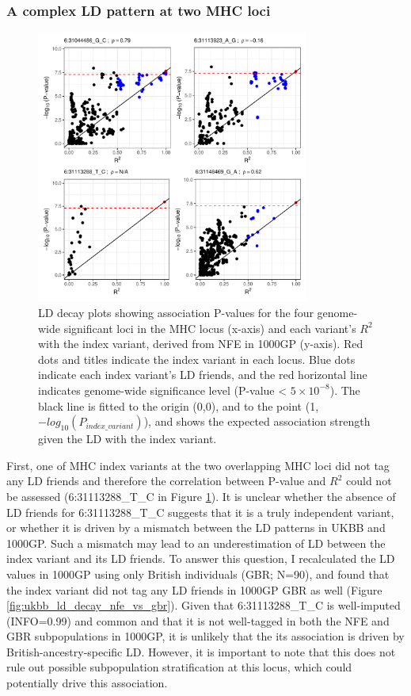   \subsubsection{A complex LD pattern at two MHC loci}
  \begin{figure}[H] 
    \centering    
    \includegraphics[width=0.8\textwidth]{ukbb_ld_decay_mhc}
    \caption[LD decay plots for the pAD-associated MHC loci in the UKBB analysis]{LD decay plots showing association P-values for the four genome-wide significant loci in the MHC locus (x-axis) and each variant's $R^{2}$ with the index variant, derived from NFE in 1000GP (y-axis). Red dots and titles indicate the index variant in each locus. Blue dots indicate each index variant's LD friends, and the red horizontal line indicates genome-wide significance level (P-value < $5\times10^{-8}$). The black line is fitted to the origin (0,0), and to the point (1,$-log_{10}(P_{index\_variant})$), and shows the expected association strength given the LD with the index variant.}
    \label{fig:ukbb_ld_decay_mhc}
    \end{figure}
  First, one of MHC index variants at the two overlapping MHC loci did not tag any LD friends and therefore the correlation between P-value and $R^{2}$ could not be assessed (6:31113288\_T\_C in Figure \ref{fig:ukbb_ld_decay_mhc}). It is unclear whether the absence of LD friends for 6:31113288\_T\_C suggests that it is a truly independent variant, or whether it is driven by a mismatch between the LD patterns in UKBB and 1000GP. Such a mismatch may lead to an underestimation of LD between the index variant and its LD friends. To answer this question, I recalculated the LD values in 1000GP using only British individuals (GBR; N=90), and found that the index variant did not tag any LD friends in 1000GP GBR as well (Figure \ref{fig:ukbb_ld_decay_nfe_vs_gbr}). Given that 6:31113288\_T\_C is well-imputed (INFO=0.99) and common and that it is not well-tagged in both the NFE and GBR subpopulations in 1000GP, it is unlikely that the its association is driven by British-ancestry-specific LD. However, it is important to note that this does not rule out possible subpopulation stratification at this locus, which could potentially drive this association. 

